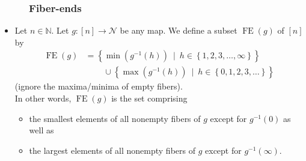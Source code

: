 \documentclass{beamer}
\newcommand{\fti}[1]{\frametitle{\ \ \ \ \ #1}}
\newcommand{\defn}[1]{{\color{darkred}\emph{#1}}} %
\theoremstyle{plain}
\begin{document}
\begin{frame}
\fti{Fiber-ends}

\begin{itemize}

\item Let $n\in\mathbb{N}$. Let $g:\left[  n\right]
\rightarrow\mathcal{N}$ be any map. We define a subset
\defn{$\operatorname*{FE}\left(  g\right)  $}
of $\left[  n\right]  $ by
\begin{align*}
\operatorname*{FE}\left(  g\right)   &  =\left\{  \min\left(  g^{-1}\left(
h\right)  \right)  \ \mid\ h\in\left\{  1,2,3,\ldots,\infty\right\}  \right\}
\\
&  \ \ \ \ \ \ \ \ \ \ \cup\left\{  \max\left(  g^{-1}\left(  h\right)
\right)  \ \mid\ h\in\left\{  0,1,2,3,\ldots\right\}  \right\}
\end{align*}
(ignore the maxima/minima of empty fibers). \\
In other words, $\operatorname*{FE}\left(  g\right)  $ is the set comprising
\begin{itemize}
\item
the smallest elements of all nonempty fibers of $g$ except for $g^{-1}\left(
0\right)  $ as well as
\item the largest elements of all nonempty fibers of $g$
except for $g^{-1}\left(  \infty\right)  $.
\end{itemize}

\end{itemize}

\end{frame}
\end{document}

